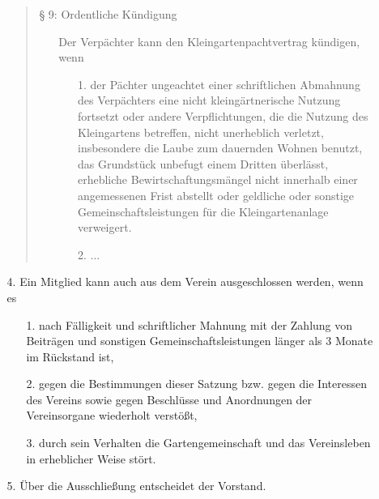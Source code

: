 \documentclass{scrartcl}
\begin{document}
\begin{itemize}
\begin{itemize}
\begin{quote}
				§ 9: Ordentliche Kündigung
					\begin{itemize}
						\item[] Der Verpächter kann den Kleingartenpachtvertrag
								kündigen, wenn
							\begin{itemize}
								\item[1.] der Pächter ungeachtet einer schriftlichen
										  Abmahnung des Verpächters eine nicht
										  kleingärtnerische Nutzung fortsetzt oder
										  andere Verpflichtungen, die die Nutzung des
										  Kleingartens betreffen, nicht unerheblich
										  verletzt, insbesondere die Laube zum dauernden
										  Wohnen benutzt, das Grundstück unbefugt einem
										  Dritten überlässt, erhebliche
										  Bewirtschaftungsmängel nicht innerhalb einer
										  angemessenen Frist abstellt oder geldliche
										  oder sonstige Gemeinschaftsleistungen für die
										  Kleingartenanlage verweigert.
								\item[2.] ...
							\end{itemize}
						\end{itemize}		
		\end{quote}
		\item[4.] Ein Mitglied kann auch aus dem Verein ausgeschlossen werden, wenn es
			\begin{enumerate}
				\item[1.] nach Fälligkeit und schriftlicher Mahnung mit der Zahlung von
						  Beiträgen und sonstigen Gemeinschaftsleistungen länger als
						  3 Monate im Rückstand ist,
				\item[2.] gegen die Bestimmungen dieser Satzung bzw. gegen die
						  Interessen des Vereins sowie gegen Beschlüsse und Anordnungen
						  der Vereinsorgane wiederholt verstößt,
				\item[3.] durch sein Verhalten die Gartengemeinschaft und das
						  Vereinsleben in erheblicher Weise stört.
			\end{enumerate}
		\item[5.] Über die Ausschließung entscheidet der Vorstand.
	\end{itemize}
\end{itemize}       


\end{document}
